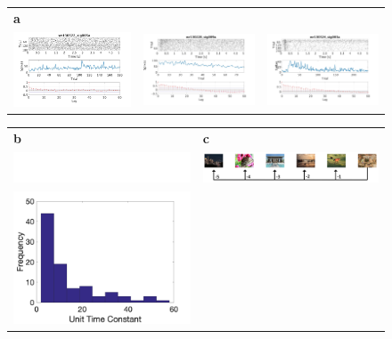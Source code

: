 \documentclass{apa}
\begin{document}
\begin{figure}
\begin{tabular}{l l l}
\textbf{a}\\
\includegraphics[width =.33\textwidth]{figs/cutAR_Rec_139_v_11.jpeg}
&\includegraphics[width =.33\textwidth]{figs/cutAR_Rec_69_v_11.jpeg}
& \includegraphics[width =.33\textwidth]{figs/cutAR_Rec_149_v_11.jpeg}
\\  
\end{tabular}
\begin{tabular}{l l }
\textbf{b}  
&\textbf{c} \\
\includegraphics[width=.48\textwidth]{figs/EmptyWhiteSpace.png}
&\includegraphics[width=.48\textwidth]{figs/RecS.png}\\
\includegraphics[width =.48\textwidth]{figs/AutoCorrDist.png}

\end{tabular}
\end{figure}
\end{document}

